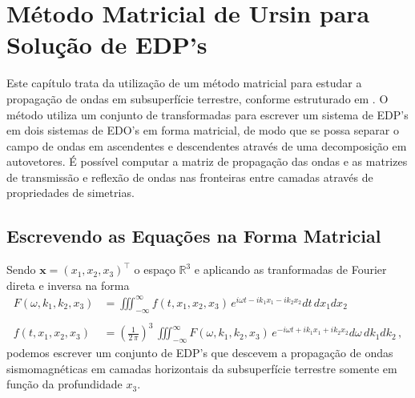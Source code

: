 \chapter{M\'etodo Matricial de Ursin para Solu\c{c}\~ao de EDP's}
Este cap\'itulo trata da utiliza\c{c}\~ao de um m\'etodo matricial para estudar a propaga\c{c}\~ao de ondas em subsuperf\'icie terrestre, conforme estruturado em \cite{Ursin-1983}. O m\'etodo utiliza um conjunto de transformadas para escrever um sistema de EDP's em dois sistemas de EDO's em forma matricial, de modo que se possa separar o campo de ondas em ascendentes e descendentes atrav\'es de uma decomposi\c{c}\~ao em autovetores. \'E poss\'ivel computar a matriz de propaga\c{c}\~ao das ondas e as matrizes de transmiss\~ao e reflex\~ao de ondas nas fronteiras entre camadas atrav\'es de propriedades de simetrias.

\section{Escrevendo as Equa\c{c}\~oes na Forma Matricial}

Sendo $\mathbf{x}=(x_1,x_2,x_3)^{\top}$ o espa\c{c}o $\mathbb{R}^3$ e aplicando as tranformadas de Fourier direta e inversa na forma
\begin{align*}
F(\omega,k_1,k_2,x_3) &= \iiint_{-\infty}^{\infty}f(t,x_1,x_2,x_3)\,e^{i\omega t-ik_1x_1-ik_2x_2}dt\,dx_1dx_2\\\\
f(t,x_1,x_2,x_3) &= \left(\frac{1}{2\,\pi}\right)^3\,\iiint_{-\infty}^{\infty}F(\omega,k_1,k_2,x_3)\,e^{-i\omega t+ik_1x_1+ik_2x_2}d\omega\,dk_1dk_2\,,
\end{align*}
podemos escrever um conjunto de EDP's que descevem a propaga\c{c}\~ao de ondas sismomagn\'eticas em camadas horizontais da subsuperf\'icie terrestre somente em fun\c{c}\~ao da profundidade $x_3$. 

